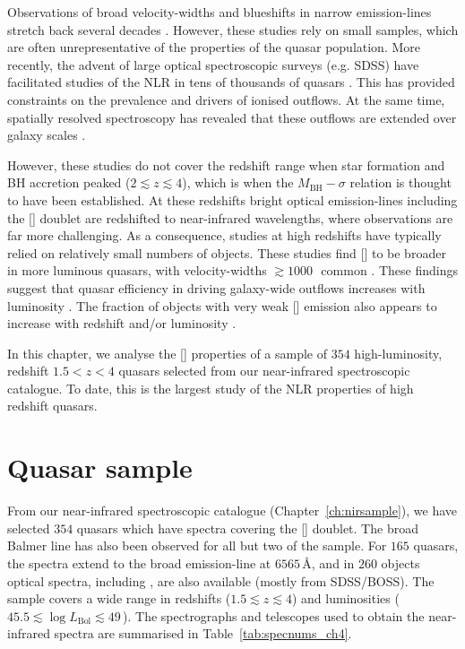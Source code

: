Observations of broad velocity-widths and blueshifts in narrow emission-lines stretch back several decades \citep[e.g.][]{weedman70,stockton76,heckman81,veron81,feldman82,heckman84,vrtilek85,whittle85,boroson92}. 
However, these studies rely on small samples, which are often unrepresentative of the properties of the quasar population. 
More recently, the advent of large optical spectroscopic surveys (e.g. SDSS) have facilitated studies of the NLR in tens of thousands of quasars \citep[e.g.][]{boroson05,greene05a,zhang11,mullaney13,zakamska14,shen14}. 
This has provided constraints on the prevalence and drivers of ionised outflows.   
At the same time, spatially resolved spectroscopy has revealed that these outflows are extended over galaxy scales \citep[e.g.][]{greene09,greene11,harrison12,hainline13,harrison14}. 

However, these studies do not cover the redshift range when star formation and BH accretion peaked ($2 \lesssim z \lesssim 4$), which is when the $M_{\text{BH}}-\sigma$ relation is thought to have been established. 
At these redshifts bright optical emission-lines including the [] doublet are redshifted to near-infrared wavelengths, where observations are far more challenging. 
As a consequence, studies at high redshifts have typically relied on relatively small numbers of objects.
These studies find [] to be broader in more luminous quasars, with velocity-widths $\gtrsim1000$\,\kms\, common \citep[e.g.][]{netzer04,kim13,brusa15,shen16a}.  
These findings suggest that quasar efficiency in driving galaxy-wide outflows increases with luminosity \citep[e.g.][]{netzer04,nesvadba08,kim13,brusa15,carniani15,perna15,bischetti16}. 
The fraction of objects with very weak [] emission also appears to increase with redshift and/or luminosity \citep[e.g.][]{netzer04}. 

In this chapter, we analyse the [] properties of a sample of $354$ high-luminosity, redshift $1.5 < z < 4$ quasars selected from our near-infrared spectroscopic catalogue.
To date, this is the largest study of the NLR properties of high redshift quasars. 

\section{Quasar sample}

From our near-infrared spectroscopic catalogue (Chapter~\ref{ch:nirsample}), we have selected $354$ quasars which have spectra covering the [] doublet. 
The broad Balmer \hb line has also been observed for all but two of the sample. 
For $165$ quasars, the spectra extend to the broad \ha emission-line at $6565$\,\AA, and in $260$ objects optical spectra, including , are also available (mostly from SDSS/BOSS). 
The sample covers a wide range in redshifts ($1.5 \lesssim z \lesssim 4$) and luminosities ($45.5 \lesssim \log L_{\text{Bol}} \lesssim 49$\,\ergs). 
The spectrographs and telescopes used to obtain the near-infrared spectra are summarised in Table~\ref{tab:specnums_ch4}.

